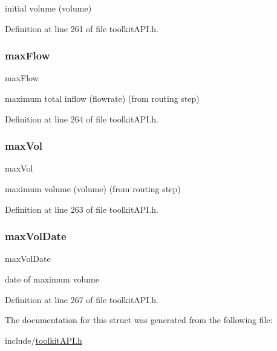 initial volume (volume) 

Definition at line 261 of file toolkit\+A\+P\+I.\+h.

\mbox{\label{struct_s_m___storage_stats_a4d84bca5454f3903c44fe865e44674f5}} 
\subsubsection{\texorpdfstring{max\+Flow}{maxFlow}}
{\footnotesize\ttfamily max\+Flow}

maximum total inflow (flowrate) (from routing step) 

Definition at line 264 of file toolkit\+A\+P\+I.\+h.

\mbox{\label{struct_s_m___storage_stats_a4e178bd9894a08b39d615b68b788e09e}} 
\subsubsection{\texorpdfstring{max\+Vol}{maxVol}}
{\footnotesize\ttfamily max\+Vol}

maximum volume (volume) (from routing step) 

Definition at line 263 of file toolkit\+A\+P\+I.\+h.

\mbox{\label{struct_s_m___storage_stats_aa1b855c3609187dd317a0d75169769ab}} 
\subsubsection{\texorpdfstring{max\+Vol\+Date}{maxVolDate}}
{\footnotesize\ttfamily max\+Vol\+Date}

date of maximum volume 

Definition at line 267 of file toolkit\+A\+P\+I.\+h.



The documentation for this struct was generated from the following file\+:\begin{DoxyCompactItemize}
\item 
include/\hyperlink{toolkit_a_p_i_8h}{toolkit\+A\+P\+I.\+h}\end{DoxyCompactItemize}
